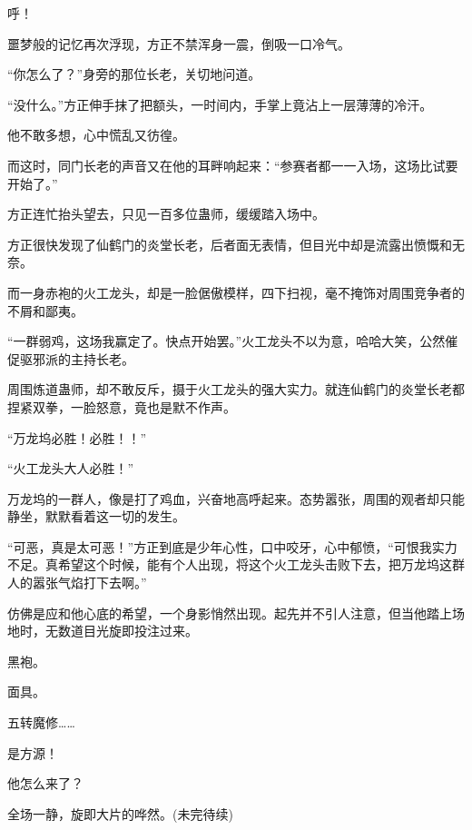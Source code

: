 \begin{this_body}
呼！

噩梦般的记忆再次浮现，方正不禁浑身一震，倒吸一口冷气。

“你怎么了？”身旁的那位长老，关切地问道。

“没什么。”方正伸手抹了把额头，一时间内，手掌上竟沾上一层薄薄的冷汗。

他不敢多想，心中慌乱又彷徨。

而这时，同门长老的声音又在他的耳畔响起来：“参赛者都一一入场，这场比试要开始了。”

方正连忙抬头望去，只见一百多位蛊师，缓缓踏入场中。

方正很快发现了仙鹤门的炎堂长老，后者面无表情，但目光中却是流露出愤慨和无奈。

而一身赤袍的火工龙头，却是一脸倨傲模样，四下扫视，毫不掩饰对周围竞争者的不屑和鄙夷。

“一群弱鸡，这场我赢定了。快点开始罢。”火工龙头不以为意，哈哈大笑，公然催促驱邪派的主持长老。

周围炼道蛊师，却不敢反斥，摄于火工龙头的强大实力。就连仙鹤门的炎堂长老都捏紧双拳，一脸怒意，竟也是默不作声。

“万龙坞必胜！必胜！！”

“火工龙头大人必胜！”

万龙坞的一群人，像是打了鸡血，兴奋地高呼起来。态势嚣张，周围的观者却只能静坐，默默看着这一切的发生。

“可恶，真是太可恶！”方正到底是少年心性，口中咬牙，心中郁愤，“可恨我实力不足。真希望这个时候，能有个人出现，将这个火工龙头击败下去，把万龙坞这群人的嚣张气焰打下去啊。”

仿佛是应和他心底的希望，一个身影悄然出现。起先并不引人注意，但当他踏上场地时，无数道目光旋即投注过来。

黑袍。

面具。

五转魔修……

是方源！

他怎么来了？

全场一静，旋即大片的哗然。(未完待续)

\end{this_body}

